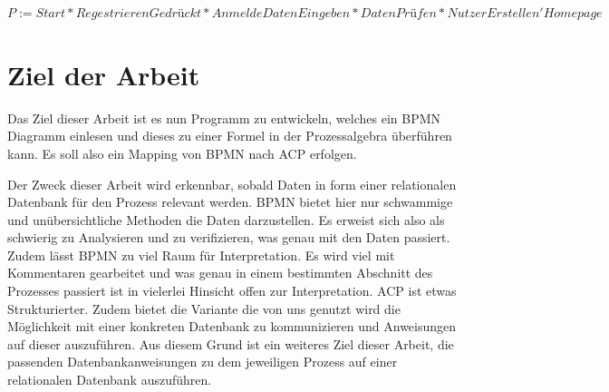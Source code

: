 $P:=Start*RegestrierenGedrückt*AnmeldeDatenEingeben*DatenPrüfen*NutzerErstellen'Homepage $


\section {Ziel der Arbeit}

Das Ziel dieser Arbeit ist es nun Programm zu entwickeln, welches ein BPMN Diagramm einlesen und dieses zu einer Formel in der Prozessalgebra überführen kann. Es soll also ein Mapping von BPMN nach ACP erfolgen. 

Der Zweck dieser Arbeit wird erkennbar, sobald Daten in form einer relationalen Datenbank für den Prozess relevant werden. BPMN bietet hier nur schwammige und unübersichtliche Methoden die Daten darzustellen. Es erweist sich also als schwierig zu Analysieren und zu verifizieren, was genau mit den Daten passiert. Zudem lässt BPMN zu viel Raum für Interpretation. Es wird viel mit Kommentaren gearbeitet und was genau in einem bestimmten Abschnitt des Prozesses passiert ist in vielerlei Hinsicht offen zur Interpretation. ACP ist etwas Strukturierter. Zudem bietet die Variante die von uns genutzt wird die Möglichkeit mit einer konkreten Datenbank zu kommunizieren und Anweisungen auf dieser auszuführen. Aus diesem Grund ist ein weiteres Ziel dieser Arbeit, die passenden Datenbankanweisungen zu dem jeweiligen Prozess auf einer relationalen Datenbank auszuführen.




